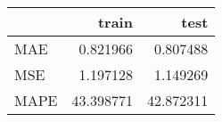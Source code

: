 \begin{tabular}{lrr}
\toprule
{} &      train &       test \\
\midrule
MAE  &   0.821966 &   0.807488 \\
MSE  &   1.197128 &   1.149269 \\
MAPE &  43.398771 &  42.872311 \\
\bottomrule
\end{tabular}
